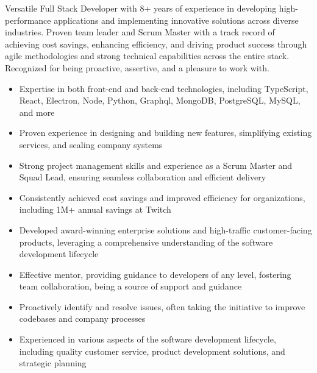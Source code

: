 \par
Versatile Full Stack Developer with 8+ years of experience in developing high-performance applications and implementing innovative solutions across diverse industries.
Proven team leader and Scrum Master with a track record of achieving cost savings, enhancing efficiency, and driving product success through agile methodologies and strong technical capabilities across the entire stack. Recognized for being proactive, assertive, and a pleasure to work with.

\begin{itemize}[itemsep=-5pt]
    \item Expertise in both front-end and back-end technologies, including TypeScript, React, Electron, Node, Python, Graphql, MongoDB, PostgreSQL, MySQL, and more
    \item Proven experience in designing and building new features, simplifying existing services, and scaling company systems
    \item Strong project management skills and experience as a Scrum Master and Squad Lead, ensuring seamless collaboration and efficient delivery
    \item Consistently achieved cost savings and improved efficiency for organizations, including \textdollar 1M+ annual savings at Twitch
    \item Developed award-winning enterprise solutions and high-traffic customer-facing products, leveraging a comprehensive understanding of the software development lifecycle
    \item Effective mentor, providing guidance to developers of any level, fostering team collaboration, being a source of support and guidance
    \item Proactively identify and resolve issues, often taking the initiative to improve codebases and company processes
    \item Experienced in various aspects of the software development lifecycle, including quality customer service, product development solutions, and strategic planning
\end{itemize}
